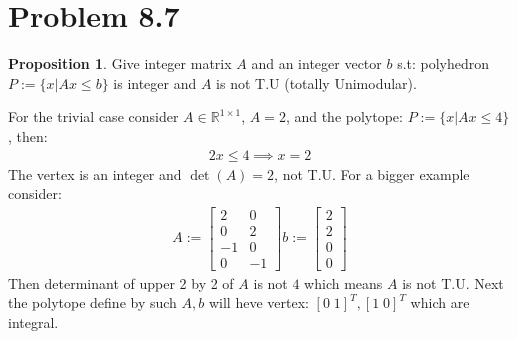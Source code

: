 \documentclass[]{article}
\theoremstyle{definition}
\newtheorem{prop}{Proposition}[section]  %
\begin{document}
\section{Problem 8.7}
    \begin{prop}
        Give integer matrix $A$ and an integer vector $b$ s.t: polyhedron $P:= \{x|Ax \le b\}$ is integer and $A$ is not T.U (totally Unimodular). 
    \end{prop}
    \par
    For the trivial case consider $A\in \mathbb R^{1\times 1}$, $A = 2$, and the polytope: $P:=\{x|Ax \le 4\}$, then: 
    \begin{align}
        2x \le 4 \implies x = 2
    \end{align}
    The vertex is an integer and $\det(A) = 2$, not T.U. For a bigger example consider: 
    \begin{align}
        A := \begin{bmatrix}
            2 & 0
            \\
            0 & 2
            \\
            -1 & 0
            \\
            0 & -1
        \end{bmatrix}
        b := \begin{bmatrix}
            2 \\2 \\ 0\\ 0
        \end{bmatrix}
    \end{align}
    Then determinant of upper 2 by 2 of $A$ is not $4$ which means $A$ is not T.U. Next the polytope define by such $A, b$ will heve vertex: $[0\; 1]^T, [1\; 0]^T$ which are integral. 
\end{document}
